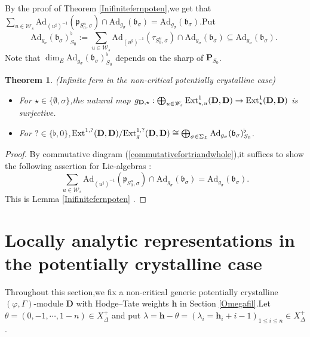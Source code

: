 \documentclass[10pt]{article}
\newtheorem{thm}{Theorem}[section]
\newcommand{\ext}{{\rm Ext}}
\newcommand{\Dpik}{{\mathbf{D}}}
\newcommand{\bP}{{\mathbf{P}}}
\newcommand{\bh}{{\mathbf{h}}}
\newcommand{\fb}{{\mathfrak{b}}}
\newcommand{\fp}{{\mathfrak{p}}}
\newcommand{\sW}{\mathscr W}
\begin{document}
By the proof of Theorem \ref{Inifinitefernpoten},\;we get that $\sum_{u\in \sW_s}\mathrm{Ad}_{(u^{\sharp})^{-1}}(\fp_{S^u_0,\sigma})\cap \mathrm{Ad}_{g_{\sigma}}(\fb_{\sigma})=\mathrm{Ad}_{g_{\sigma}}(\fb_{\sigma})$.\;Put
\begin{equation}
	\mathrm{Ad}_{g_{\sigma}}(\fb_{\sigma})_{S_0}^{\flat}:=\sum_{u\in \sW_s}\mathrm{Ad}_{(u^{\sharp})^{-1}}(\tau_{S^u_0,\sigma})\cap \mathrm{Ad}_{g_{\sigma}}(\fb_{\sigma})\subseteq \mathrm{Ad}_{g_{\sigma}}(\fb_{\sigma}).\;
\end{equation}
Note that $\dim_E\mathrm{Ad}_{g_{\sigma}}(\fb_{\sigma})_{S_0}^{\flat}$ depends on  the sharp of $\bP_{S_0}$.\;
\begin{thm} (Infinite fern in the non-critical potentially crystalline case)\label{infinitePoten} 
	\begin{itemize} 
		\item[(1)] For $\star\in\{\emptyset,\sigma\}$,\;the natural map  $g_{\Dpik,\star}:\bigoplus_{u\in \sW_{s}}{\ext}^{1}_{\star,u}(\Dpik,\Dpik)\rightarrow {\ext}^1_{\star}(\Dpik,\Dpik)$  is surjective.\;
		\item[(2)] For $?\in\{\flat,0\}$,\;${\ext}^{1,?}(\Dpik,\Dpik)/\ext^{1,?}_{g}({\Dpik},{\Dpik})\cong \bigoplus_{\sigma\in \Sigma_L}\mathrm{Ad}_{g_{\sigma}}(\fb_{\sigma})_{S_0}^{\flat}$.\;
	\end{itemize}
\end{thm}
\begin{proof}By commutative diagram (\ref{commutativefortriandwhole}),\;it suffices to show the following assertion for Lie-algebras :
		\[\sum_{u\in \sW_s}\mathrm{Ad}_{(u^{\sharp})^{-1}}(\fp_{S^u_0,\sigma})\cap \mathrm{Ad}_{g_{\sigma}}(\fb_{\sigma})=\mathrm{Ad}_{g_{\sigma}}(\fb_{\sigma}).\]
This is Lemma \ref{Inifinitefernpoten} .\;
\end{proof}







	


\section{Locally analytic representations in the potentially crystalline case}

Throughout this section,\;we fix a non-critical generic potentially crystalline $(\varphi,\Gamma)$-module $\Dpik$ with Hodge--Tate weights $\bh$ in Section \ref{Omegafil}.\;Let $\theta=(0,-1,\cdots,1-n)\in X_{\Delta}^+$ and put $\lambda=\bh-\theta=(\lambda_i=\bh_i+i-1)_{1\leq i\leq n}\in X_{\Delta}^+$.\;
\end{document}

